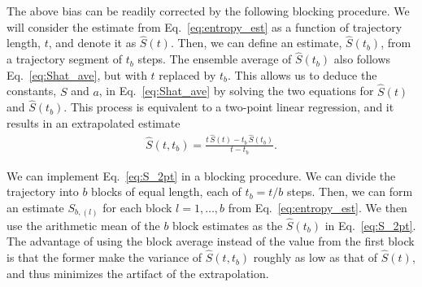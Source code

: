 \documentclass[reprint, superscriptaddress]{revtex4-1}
\begin{document}
The above bias can be readily corrected by the following blocking procedure.
%
We will consider the estimate from Eq.~\eqref{eq:entropy_est}
as a function of trajectory length, $t$, and denote it as $\hat S(t)$.
%
Then, we can define an estimate, $\hat S(t_b)$,
from a trajectory segment of $t_b$ steps.
%
The ensemble average of $\hat S(t_b)$ also follows
Eq.~\eqref{eq:Shat_ave}, but with $t$ replaced by $t_b$.
%
This allows us to deduce the constants, $S$ and $a$, in Eq.~\eqref{eq:Shat_ave}
by solving the two equations for $\hat S(t)$ and $\hat S(t_b)$.
%
This process is equivalent to a two-point linear regression,
and it results in an extrapolated estimate
%
\begin{align}
    \hat S(t, t_b)
    =
    \frac{ t \, \hat S(t) - t_b \, \hat S(t_b) }
         { t - t_b }
    .
    \label{eq:S_2pt}
\end{align}

We can implement Eq.~\eqref{eq:S_2pt} in a blocking procedure.
%
We can divide the trajectory into $b$ blocks of equal length,
each of $t_b = t/b$ steps.
%
Then, we can form an estimate $S_{b, (l)}$ for each block $l = 1, \dots, b$ from Eq.~\eqref{eq:entropy_est}.
%
We then use the arithmetic mean of the $b$ block estimates
as the $\hat S(t_b)$ in Eq.~\eqref{eq:S_2pt}.
%
The advantage of using the block average instead of
the value from the first block is that
the former make the variance of $\hat S(t, t_b)$
roughly as low as that of $\hat S(t)$,
and thus minimizes the artifact of the extrapolation.


%
\end{document}
